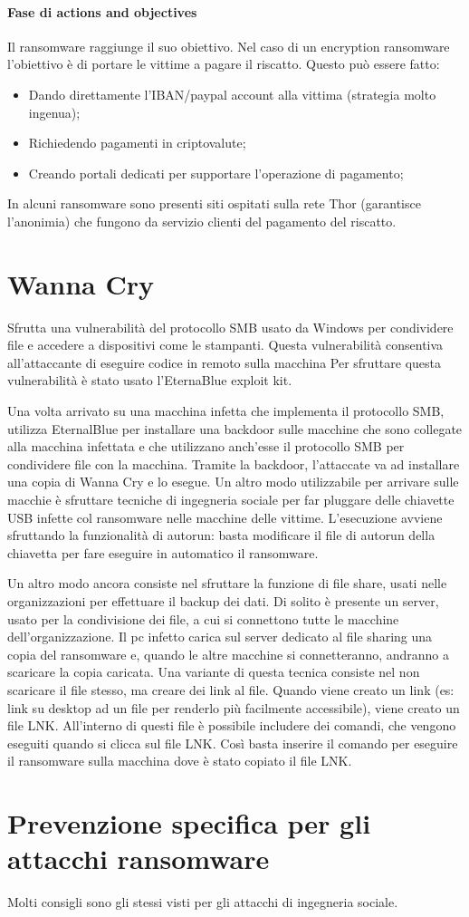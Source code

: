 \paragraph{Fase di actions and objectives}
Il ransomware raggiunge il suo obiettivo. Nel caso di un encryption ransomware l'obiettivo è di portare le vittime a pagare il riscatto. Questo può essere fatto:
\begin{itemize}
    \item Dando direttamente l'IBAN/paypal account alla vittima (strategia molto ingenua);
    \item Richiedendo pagamenti in criptovalute;
    \item Creando portali dedicati per supportare l'operazione di pagamento;
\end{itemize}

In alcuni ransomware sono presenti siti ospitati sulla rete Thor (garantisce l'anonimia) che fungono da servizio clienti del pagamento del riscatto.

\section{Wanna Cry}
Sfrutta una vulnerabilità del protocollo SMB usato da Windows per condividere file e accedere a dispositivi come le stampanti. Questa vulnerabilità consentiva all'attaccante di eseguire codice in remoto sulla macchina Per sfruttare questa vulnerabilità è stato usato l'EternaBlue exploit kit.  

Una volta arrivato su una macchina infetta che implementa il protocollo SMB, utilizza EternalBlue per installare una backdoor sulle macchine che sono collegate alla macchina infettata e che utilizzano anch'esse il protocollo SMB per condividere file con la macchina. Tramite la backdoor, l'attaccate va ad installare una copia di Wanna Cry e lo esegue.  Un altro modo utilizzabile per arrivare sulle macchie è sfruttare tecniche di ingegneria sociale per far pluggare delle chiavette USB infette col ransomware nelle macchine delle vittime. L'esecuzione avviene sfruttando la funzionalità di autorun: basta modificare il file di autorun della chiavetta per fare eseguire in automatico il ransomware.

Un altro modo ancora consiste nel sfruttare la funzione di file share, usati nelle organizzazioni per effettuare il backup dei dati. Di solito è presente un server, usato per la condivisione dei file, a cui si connettono tutte le macchine dell'organizzazione. Il pc infetto carica sul server dedicato al file sharing una copia del ransomware e, quando le altre macchine si connetteranno, andranno a scaricare la copia caricata. Una variante di questa tecnica consiste nel non scaricare il file stesso, ma creare dei link al file. Quando viene creato un link (es: link su desktop ad un file per renderlo più facilmente accessibile), viene creato un file LNK. All'interno di questi file è possibile includere dei comandi, che vengono eseguiti quando si clicca sul file LNK. Così basta inserire il comando per eseguire il ransomware sulla macchina dove è stato copiato il file LNK. 

\section{Prevenzione specifica per gli attacchi ransomware}
Molti consigli sono gli stessi visti per gli attacchi di ingegneria sociale. 